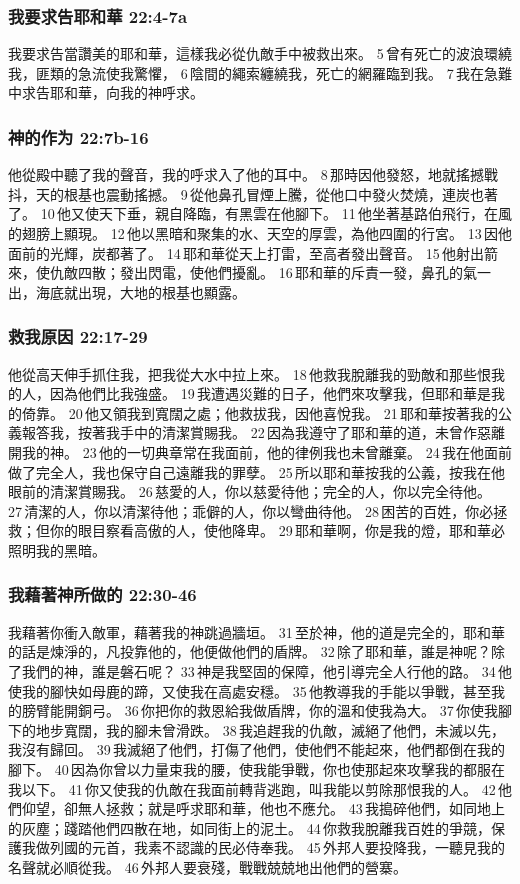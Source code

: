 \subsubsection{我要求告耶和華 22:4-7a}
我要求告當讚美的耶和華，這樣我必從仇敵手中被救出來。 5 曾有死亡的波浪環繞我，匪類的急流使我驚懼， 6 陰間的繩索纏繞我，死亡的網羅臨到我。 7 我在急難中求告耶和華，向我的神呼求。

\subsubsection{神的作为 22:7b-16}
他從殿中聽了我的聲音，我的呼求入了他的耳中。 8 那時因他發怒，地就搖撼戰抖，天的根基也震動搖撼。 9 從他鼻孔冒煙上騰，從他口中發火焚燒，連炭也著了。 10 他又使天下垂，親自降臨，有黑雲在他腳下。 11 他坐著基路伯飛行，在風的翅膀上顯現。 12 他以黑暗和聚集的水、天空的厚雲，為他四圍的行宮。 13 因他面前的光輝，炭都著了。 14 耶和華從天上打雷，至高者發出聲音。 15 他射出箭來，使仇敵四散；發出閃電，使他們擾亂。 16 耶和華的斥責一發，鼻孔的氣一出，海底就出現，大地的根基也顯露。 

\subsubsection{救我原因 22:17-29}
他從高天伸手抓住我，把我從大水中拉上來。 18 他救我脫離我的勁敵和那些恨我的人，因為他們比我強盛。 19 我遭遇災難的日子，他們來攻擊我，但耶和華是我的倚靠。 20 他又領我到寬闊之處；他救拔我，因他喜悅我。 21 耶和華按著我的公義報答我，按著我手中的清潔賞賜我。 22 因為我遵守了耶和華的道，未曾作惡離開我的神。 23 他的一切典章常在我面前，他的律例我也未曾離棄。 24 我在他面前做了完全人，我也保守自己遠離我的罪孽。 25 所以耶和華按我的公義，按我在他眼前的清潔賞賜我。 26 慈愛的人，你以慈愛待他；完全的人，你以完全待他。 27 清潔的人，你以清潔待他；乖僻的人，你以彎曲待他。 28 困苦的百姓，你必拯救；但你的眼目察看高傲的人，使他降卑。 29 耶和華啊，你是我的燈，耶和華必照明我的黑暗。 

\subsubsection{我藉著神所做的 22:30-46}
我藉著你衝入敵軍，藉著我的神跳過牆垣。 31 至於神，他的道是完全的，耶和華的話是煉淨的，凡投靠他的，他便做他們的盾牌。 32 除了耶和華，誰是神呢？除了我們的神，誰是磐石呢？ 33 神是我堅固的保障，他引導完全人行他的路。 34 他使我的腳快如母鹿的蹄，又使我在高處安穩。 35 他教導我的手能以爭戰，甚至我的膀臂能開銅弓。 36 你把你的救恩給我做盾牌，你的溫和使我為大。 37 你使我腳下的地步寬闊，我的腳未曾滑跌。 38 我追趕我的仇敵，滅絕了他們，未滅以先，我沒有歸回。 39 我滅絕了他們，打傷了他們，使他們不能起來，他們都倒在我的腳下。 40 因為你曾以力量束我的腰，使我能爭戰，你也使那起來攻擊我的都服在我以下。 41 你又使我的仇敵在我面前轉背逃跑，叫我能以剪除那恨我的人。 42 他們仰望，卻無人拯救；就是呼求耶和華，他也不應允。 43 我搗碎他們，如同地上的灰塵；踐踏他們四散在地，如同街上的泥土。 44 你救我脫離我百姓的爭競，保護我做列國的元首，我素不認識的民必侍奉我。 45 外邦人要投降我，一聽見我的名聲就必順從我。 46 外邦人要衰殘，戰戰兢兢地出他們的營寨。

